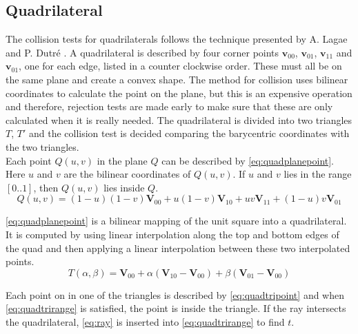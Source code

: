 \documentclass[a4paper, 12pt]{report}
\begin{document}
\subsection{Quadrilateral}
The collision tests for quadrilaterals follows the technique presented by A. Lagae and P. Dutr\'{e} \cite{quadrilateral}.
A quadrilateral is described by four corner points $ \mathbf{v}_{00} $, $ \mathbf{v}_{01}$, $ \mathbf{v}_{11} $ and $ \mathbf{v}_{01} $, one for each edge, listed in a counter clockwise order.
These must all be on the same plane and create a convex shape.
The method for collision uses bilinear coordinates to calculate the point on the plane, but this is an expensive operation and therefore, rejection tests are made early to make sure that these are only calculated when it is really needed.
The quadrilateral is divided into two triangles $ T $, $ T' $ and the collision test is decided comparing the barycentric coordinates with the two triangles. \\

Each point $ Q(u, v) $ in the plane $ Q $ can be described by \autoref{eq:quadplanepoint}.
Here $ u $ and $ v $ are the bilinear coordinates of $Q(u,v)$. 
If $ u $ and $ v $ lies in the range $ [0 .. 1] $, then $ Q(u,v) $ lies inside $ Q $.\\

\begin{equation} \label{eq:quadplanepoint}
Q(u,v) = (1 - u) (1 - v) \mathbf{V}_{00} + u (1 - v) \mathbf{V}_{10} + uv\mathbf{V}_{11} + (1 - u) v \mathbf{V}_{01}
\end{equation}

\autoref{eq:quadplanepoint} is a bilinear mapping of the unit square into a quadrilateral.
It is computed by using linear interpolation along the top and bottom edges of the quad and then applying a linear interpolation between these two interpolated points.\\

\begin{equation}
\label{eq:quadtripoint}
T(\alpha, \beta) = \mathbf{V}_{00} + \alpha ( \mathbf{V}_{10} - \mathbf{V}_{00}) + \beta (\mathbf{V}_{01} - \mathbf{V}_{00})
\end{equation}

Each point on in one of the triangles is described by \autoref{eq:quadtripoint} and when \autoref{eq:quadtrirange} is satisfied, the point is inside the triangle.
If the ray intersects the quadrilateral, \autoref{eq:ray} is inserted into \autoref{eq:quadtrirange} to find $t$.
\end{document}
